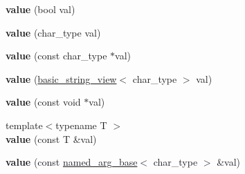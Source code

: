 \begin{DoxyCompactItemize}
{\bfseries value} (bool val)
\item 
\mbox{\label{classinternal_1_1value_ab49ce2d958b55cf0498cfcce748dc7c7}} 
{\bfseries value} (char\+\_\+type val)
\item 
\mbox{\label{classinternal_1_1value_a6c49de972ba65b5f001650621e0f1f0e}} 
{\bfseries value} (const char\+\_\+type $\ast$val)
\item 
\mbox{\label{classinternal_1_1value_adeb52dcf1b9767046e11899cf6a812ec}} 
{\bfseries value} (\hyperlink{classbasic__string__view}{basic\+\_\+string\+\_\+view}$<$ char\+\_\+type $>$ val)
\item 
\mbox{\label{classinternal_1_1value_acf3509a16c38533d3fc583086b73505e}} 
{\bfseries value} (const void $\ast$val)
\item 
\mbox{\label{classinternal_1_1value_ae8ae97a2e4fe75ae2916044362bf7319}} 
{\footnotesize template$<$typename T $>$ }\\{\bfseries value} (const T \&val)
\item 
\mbox{\label{classinternal_1_1value_a6fd64b8a1898acdb77b7787d44c1270c}} 
{\bfseries value} (const \hyperlink{structinternal_1_1named__arg__base}{named\+\_\+arg\+\_\+base}$<$ char\+\_\+type $>$ \&val)
\end{DoxyCompactItemize}
